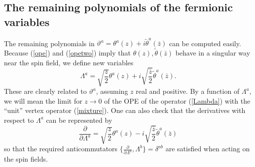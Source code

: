 \documentclass[nohyper,12pt,letterpaper]{JHEP3}
\def \tilde{\widetilde}
\def \eqn#1#2{\begin{equation}#2\label{#1}\end{equation}}
\def \vt{\vartheta}
\def \ttheta{{\tilde \theta}}
\def\p{\partial }
\begin{document}
\subsection{The remaining polynomials of the fermionic variables}

The remaining polynomials in $\vt^a=\theta^a(z)+i\ttheta^a(\bar z)$ can be 
computed easily. Because (\ref{ope}) and (\ref{opetwo}) imply that 
$\theta(z),\ttheta(\bar z)$ behave in a singular way near the spin field, 
we define new variables
\eqn{Lambda}{\Lambda^a=\sqrt{\frac z2}\theta^a(z)+i\sqrt{\frac{\bar z}2}\ttheta^a(\bar 
z).}
These are clearly related to $\vt^a$, assuming $z$ real and positive.
By a function of $\Lambda^a$, we will mean the limit for $z\to 0$ of the 
OPE of the operator (\ref{Lambda}) with the ``unit'' vertex operator
(\ref{mixture}). One can also check that the derivatives with respect to
$\Lambda^a$ can be represented by
\eqn{derlambda}{\frac{\p}{\p\Lambda^a}=\sqrt{\frac z2}
\theta^a(z)-i\sqrt{\frac{\bar z}2}\ttheta^a(\bar 
z)}
so that the required anticommutators $\{\frac{\p}{\p\Lambda^a},\Lambda^b\}=\delta^{ab}$
are satisfied when acting on the spin fields.
\end{document}
